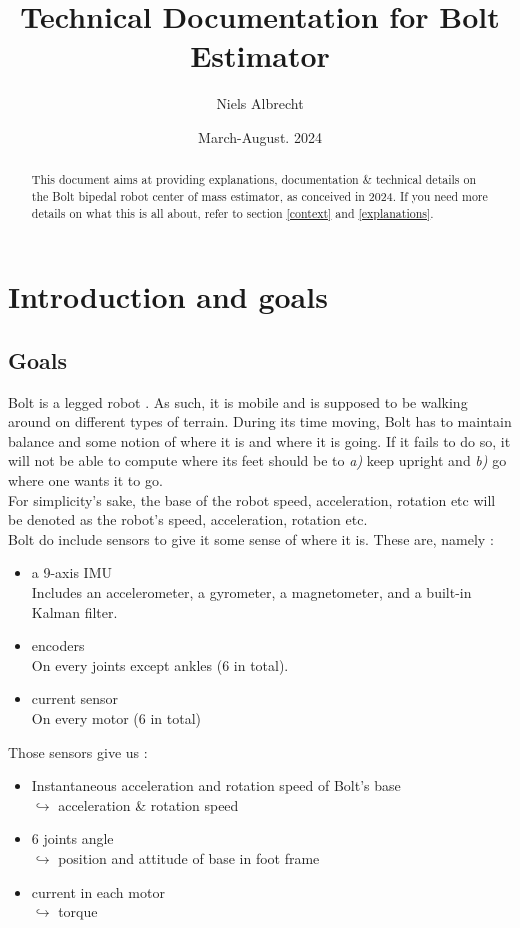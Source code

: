 \documentclass[a4paper,10pt]{article}
\title{Technical Documentation for Bolt Estimator}
\date{March-August. 2024}
\author{Niels Albrecht}
\begin{document}
\maketitle

\begin{abstract}
This document aims at providing explanations, documentation \& technical details on the Bolt bipedal robot center of mass estimator, as conceived in 2024. If you need more details on what this is all about, refer to section \ref{context} and \ref{explanations}.

\end{abstract}

\newpage
\tableofcontents
\newpage

\section{Introduction and goals}
\subsection{Goals}
Bolt is a legged robot \cite{2} \cite{5}. As such, it is mobile and is supposed to be walking around on different types of terrain. During its time moving, Bolt has to maintain balance and some notion of where it is and where it is going. If it fails to do so, it will not be able to compute where its feet should be to \textit{a)} keep upright and \textit{b)} go where one wants it to go.\\
For simplicity's sake, the base of the robot speed, acceleration, rotation etc will be denoted as the robot's speed, acceleration, rotation etc.\\
Bolt do include sensors to give it some sense of where it is. These are, namely :

\begin{itemize}
	\item{a 9-axis IMU \cite{11}}\\
	Includes an accelerometer, a gyrometer, a magnetometer, and a built-in Kalman filter.
	\item{encoders}\\
	On every joints except ankles (6 in total).
	\item{current sensor}\\
	On every motor (6 in total)
\end{itemize}
\medskip
Those sensors give us :
\begin{itemize}
	\item{Instantaneous acceleration and rotation speed of Bolt's base\\
	$\hookrightarrow$ acceleration \& rotation speed}
	\item{6 joints angle\\
	$\hookrightarrow$ position and attitude of base in foot frame}
	\item{current in each motor\\
	$\hookrightarrow$ torque}
\end{itemize}
\end{document}
